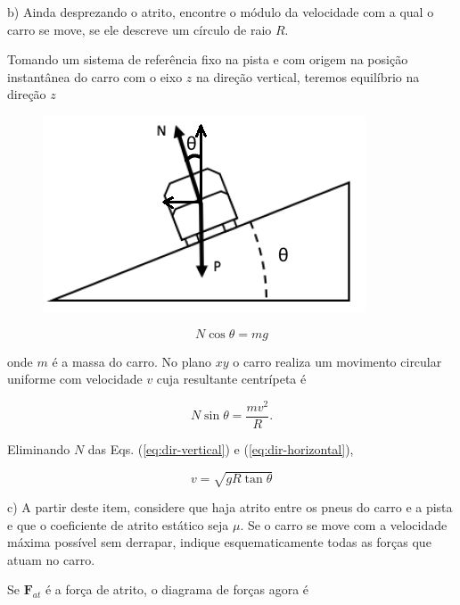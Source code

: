 \begin{enumerate}[start=1,label={\bfseries Q\arabic*.}]
b) Ainda desprezando o atrito, encontre o módulo da velocidade com a qual o carro se move, se ele descreve um círculo de raio $R$.

\resposta Tomando um sistema de referência fixo na pista e com origem na posição instantânea do carro com o eixo $z$ na direção vertical, teremos equilíbrio na direção $z$

\begin{figure}[H]
	\centering
	\includegraphics[scale=0.8]{classica-img/inclina1b}
\end{figure}



\begin{equation} \label{eq:dir-vertical}
 N \cos \theta = m g
\end{equation}

onde $m$ é a massa do carro. No plano $xy$ o carro realiza um movimento circular uniforme com velocidade $v$ cuja resultante centrípeta é

\begin{equation} \label{eq:dir-horizontal}
N \sin \theta = \frac{mv^{2}}{R}.
\end{equation}

Eliminando $N$ das Eqs. (\ref{eq:dir-vertical}) e (\ref{eq:dir-horizontal}),

$$
v = \sqrt{gR\tan \theta}
$$

c) A partir deste item, considere que haja atrito entre os pneus do carro e a pista e que o coeficiente de atrito estático seja $\mu$. Se o carro se move com a velocidade máxima possível sem derrapar, indique esquematicamente todas as forças que atuam no carro.

\resposta Se $\mathbf{F}_{at}$ é a força de atrito, o diagrama de forças agora é


\end{enumerate}
